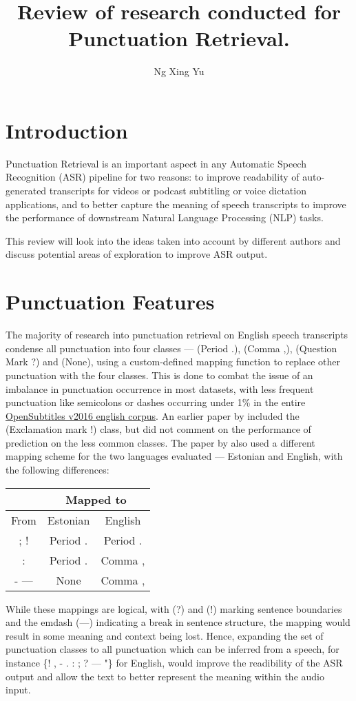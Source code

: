 \documentclass[a4paper]{article}
\title{Review of research conducted for Punctuation Retrieval.}
\author{Ng Xing Yu}
\date{}
\begin{document}
\maketitle

\section{Introduction}
\label{introduction}
Punctuation Retrieval is an important aspect in any Automatic Speech Recognition (ASR) pipeline for two reasons: to improve readability of auto-generated transcripts for videos or podcast subtitling or voice dictation applications, and to better capture the meaning of speech transcripts to improve the performance of downstream Natural Language Processing (NLP) tasks.

This review will look into the ideas taken into account by different authors and discuss potential areas of exploration to improve ASR output.

\section{Punctuation Features}
The majority of research into punctuation retrieval on English speech transcripts condense all punctuation into four classes --- (Period .), (Comma ,), (Question Mark ?) and (None), using a custom-defined mapping function to replace other punctuation with the four classes. This is done to combat the issue of an imbalance in punctuation occurrence in most datasets, with less frequent punctuation like semicolons or dashes occurring under 1\% in the entire \href{http://opus.nlpl.eu/OpenSubtitles-v2016.php}{OpenSubtitles v2016 english corpus}. An earlier paper by \cite{dynamiccrf} included the (Exclamation mark !) class, but did not comment on the performance of prediction on the less common classes. 
The paper by \cite{birnnattention} also used a different mapping scheme for the two languages evaluated --- Estonian and English, with the following differences:
\begin{center}
\begin{tabular}{|c|c|c|}
\hline
 &\multicolumn{2}{|c|}{Mapped to} \\
 \hline
From & Estonian & English \\
\hline
; ! & Period . & Period . \\
: & Period . & Comma , \\
- --- & None & Comma ,\\
\hline
\end{tabular}
\end{center}
While these mappings are logical, with (?) and (!) marking sentence boundaries and the emdash (---) indicating a break in sentence structure, the mapping would result in some meaning and context being lost. Hence, expanding the set of punctuation classes to all punctuation which can be inferred from a speech, for instance \{! , - . : ; ? --- \textellipsis "\} for English, would improve the readibility of the ASR output and allow the text to better represent the meaning within the audio input.
\end{document}
